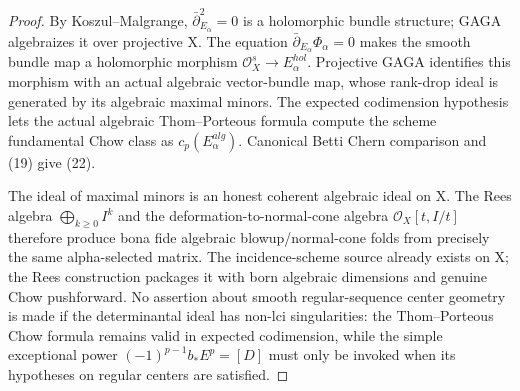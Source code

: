 \documentclass[11pt]{article}
\begin{document}
\begin{proof}
By Koszul--Malgrange,
$\bar\partial_{E_\alpha}^2=0$
is a holomorphic bundle
structure; GAGA algebraizes
it over projective X.
The equation
$\bar\partial_{E_\alpha}
\Phi_\alpha=0$ makes the
smooth bundle map a
holomorphic morphism
$\mathcal O_X^s\to E_\alpha^{hol}$.
Projective GAGA identifies
this morphism with an actual
algebraic vector-bundle map,
whose rank-drop ideal is
generated by its algebraic
maximal minors. The expected
codimension hypothesis lets
the actual algebraic
Thom--Porteous formula compute
the scheme fundamental Chow
class as $c_p(E_\alpha^{alg})$.
Canonical Betti
Chern comparison and (19)
give (22).

The ideal of maximal minors
is an honest coherent
algebraic ideal on X. The
Rees algebra
$\bigoplus_{k\ge0}I^k$ and
the deformation-to-normal-cone
algebra $\mathcal O_X[t,I/t]$
therefore produce bona fide
algebraic blowup/normal-cone
folds from precisely the same
alpha-selected matrix.
The incidence-scheme source
already exists on X; the
Rees construction packages
it with born algebraic
dimensions and genuine
Chow pushforward.
No assertion about smooth
regular-sequence center
geometry is made if the
determinantal ideal has
non-lci singularities:
the Thom--Porteous Chow
formula remains valid in
expected codimension, while
the simple exceptional power
$(-1)^{p-1}b_*E^p=[D]$
must only be invoked when
its hypotheses on regular
centers are satisfied.
\end{proof}
\end{document}

